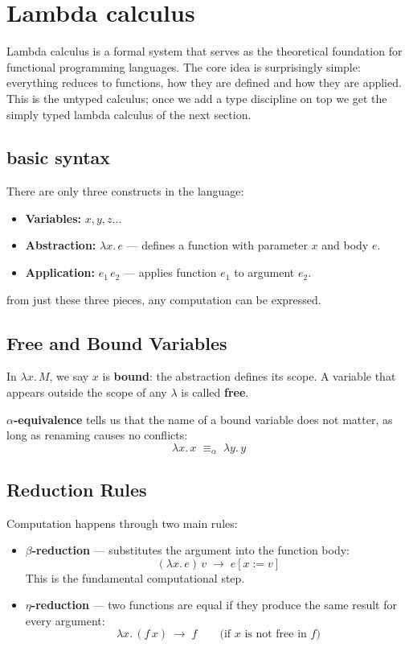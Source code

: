 \section{Lambda calculus}
Lambda calculus is a formal system that serves as the theoretical foundation for functional programming languages. The core idea is surprisingly simple: everything reduces to functions, how they are defined and how they are applied. This is the untyped calculus; once we add a type discipline on top we get the simply typed lambda calculus of the next section.

\subsection{basic syntax}
There are only three constructs in the language:


\begin{itemize}
    \item \textbf{Variables:} $x, y, z \dots$
    \item \textbf{Abstraction:} $\lambda x.\, e$ — defines a function with
    parameter $x$ and body $e$.
    \item \textbf{Application:} $e_1\, e_2$ — applies function $e_1$ to
    argument $e_2$.
\end{itemize}

from just these three pieces, any computation can be expressed.


\subsection{Free and Bound Variables}
In $\lambda x.\, M$, we say $x$ is \textbf{bound}: the abstraction defines
its scope. A variable that appears outside the scope of any $\lambda$ is
called \textbf{free}.

\textbf{$\alpha$-equivalence} tells us that the name of a bound variable
does not matter, as long as renaming causes no conflicts:
\[
  \lambda x.\, x \;\equiv_\alpha\; \lambda y.\, y
\]

\subsection{Reduction Rules}
Computation happens through two main rules:
\begin{itemize}
    \item \textbf{$\beta$-reduction} — substitutes the argument into the
    function body:
    \[(\lambda x.\, e)\, v \;\to\; e[x := v]\]
    This is the fundamental computational step.

    \item \textbf{$\eta$-reduction} — two functions are equal if they produce
    the same result for every argument:
    \[\lambda x.\, (f\, x) \;\to\; f \qquad \text{(if $x$ is not free in
    $f$)}\]
\end{itemize}

